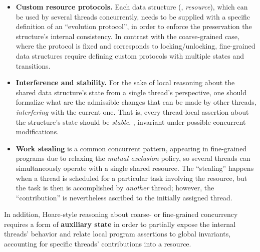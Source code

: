 \documentclass[blockstyle,preprint,nocopyrightspace]{sigplanconf}
\begin{document}
\begin{itemize}[leftmargin=*]

\item \textbf{Custom resource protocols.} Each data structure (\ie,
  \emph{resource}), which can be used by several threads concurrently,
  needs to be supplied with a specific definition of an ``evolution
  protocol'', in order to enforce the preservation the structure's
  internal consistency. In contrast with the coarse-grained case,
  where the protocol is fixed and corresponds to locking/unlocking,
  fine-grained data structures require defining custom protocols with
  multiple states and transitions.
  
\item \textbf{Interference and stability.} For the sake of local
  reasoning about the shared data structure's state from a single
  thread's perspective, one should formalize what are the admissible
  changes that can be made by other threads, \emph{interfering} with
  the current one. That is, every thread-local assertion about the
  structure's state should be \emph{stable}, \ie, invariant under
  possible concurrent modifications.

\item \textbf{Work stealing} is a common concurrent pattern, appearing
  in fine-grained programs due to relaxing the \emph{mutual exclusion}
  policy, so several threads can simultaneously operate with a single
  shared resource. The ``stealing'' happens when a thread is scheduled
  for a particular task involving the resource, but the task is then
  is accomplished by \emph{another} thread; however, the
  ``contribution'' is nevertheless ascribed to the initially assigned
  thread.

\end{itemize}
%
\noindent
%
In addition, Hoare-style reasoning about coarse- or fine-grained
concurrency requires a form of \textbf{auxiliary state} in order to
partially expose the internal threads' behavior and relate local
program assertions to global invariants, accounting for specific
threads' contributions into a resource.
%
\end{document}
